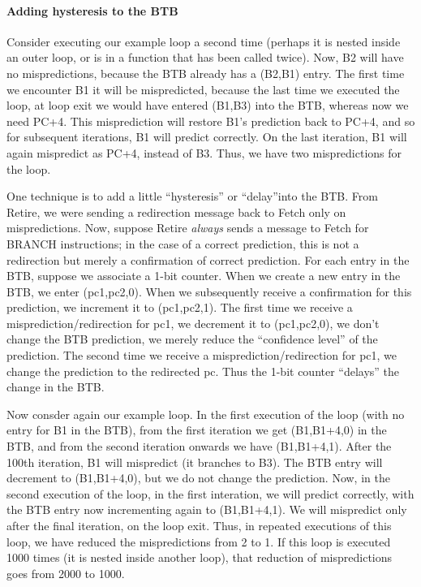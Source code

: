 \paragraph{Adding hysteresis to the BTB}

\label{Sec_BTBs_w_hysteresis}


Consider executing our example loop a second time (perhaps it is
nested inside an outer loop, or is in a function that has been called
twice).  Now, B2 will have no mispredictions, because the BTB already
has a (B2,B1) entry.  The first time we encounter B1 it will be
mispredicted, because the last time we executed the loop, at loop exit
we would have entered (B1,B3) into the BTB, whereas now we need PC+4.
This misprediction will restore B1's prediction back to PC+4, and so
for subsequent iterations, B1 will predict correctly. On the last
iteration, B1 will again mispredict as PC+4, instead of B3.  Thus, we
have two mispredictions for the loop.

One technique is to add a little ``hysteresis'' or ``delay''into the
BTB.  From Retire, we were sending a redirection message back to Fetch
only on mispredictions.  Now, suppose Retire \emph{always} sends a
message to Fetch for BRANCH instructions; in the case of a correct
prediction, this is not a redirection but merely a confirmation of
correct prediction.  For each entry in the BTB, suppose we associate a
1-bit counter.  When we create a new entry in the BTB, we enter
(pc1,pc2,0).  When we subsequently receive a confirmation for this
prediction, we increment it to (pc1,pc2,1).  The first time we receive
a misprediction/redirection for pc1, we decrement it to (pc1,pc2,0),
{\ie} we don't change the BTB prediction, we merely reduce the
``confidence level'' of the prediction.  The second time we receive a
misprediction/redirection for pc1, we change the prediction to the
redirected pc.  Thus the 1-bit counter ``delays'' the change in the
BTB.

Now consder again our example loop.  In the first execution of the
loop (with no entry for B1 in the BTB), from the first iteration we
get (B1,B1+4,0) in the BTB, and from the second iteration onwards we
have (B1,B1+4,1). After the 100th iteration, B1 will mispredict (it
branches to B3).  The BTB entry will decrement to (B1,B1+4,0), but we
do not change the prediction.  Now, in the second execution of the
loop, in the first interation, we will predict correctly, with the BTB
entry now incrementing again to (B1,B1+4,1).  We will mispredict only
after the final iteration, on the loop exit.  Thus, in repeated
executions of this loop, we have reduced the mispredictions from 2 to
1.  If this loop is executed 1000 times (it is nested inside another
loop), that reduction of mispredictions goes from 2000 to 1000.

